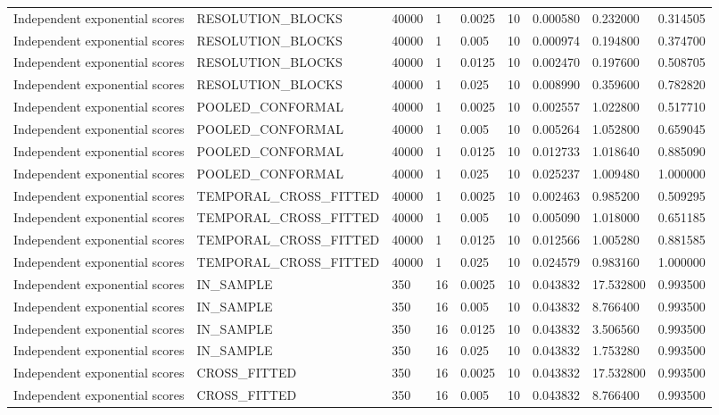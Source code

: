\begin{tabular}{lllllllll}
Independent exponential scores & RESOLUTION\_BLOCKS & 40000 & 1 & 0.0025 & 10 & 0.000580 & 0.232000 & 0.314505 \\
Independent exponential scores & RESOLUTION\_BLOCKS & 40000 & 1 & 0.005 & 10 & 0.000974 & 0.194800 & 0.374700 \\
Independent exponential scores & RESOLUTION\_BLOCKS & 40000 & 1 & 0.0125 & 10 & 0.002470 & 0.197600 & 0.508705 \\
Independent exponential scores & RESOLUTION\_BLOCKS & 40000 & 1 & 0.025 & 10 & 0.008990 & 0.359600 & 0.782820 \\
Independent exponential scores & POOLED\_CONFORMAL & 40000 & 1 & 0.0025 & 10 & 0.002557 & 1.022800 & 0.517710 \\
Independent exponential scores & POOLED\_CONFORMAL & 40000 & 1 & 0.005 & 10 & 0.005264 & 1.052800 & 0.659045 \\
Independent exponential scores & POOLED\_CONFORMAL & 40000 & 1 & 0.0125 & 10 & 0.012733 & 1.018640 & 0.885090 \\
Independent exponential scores & POOLED\_CONFORMAL & 40000 & 1 & 0.025 & 10 & 0.025237 & 1.009480 & 1.000000 \\
Independent exponential scores & TEMPORAL\_CROSS\_FITTED & 40000 & 1 & 0.0025 & 10 & 0.002463 & 0.985200 & 0.509295 \\
Independent exponential scores & TEMPORAL\_CROSS\_FITTED & 40000 & 1 & 0.005 & 10 & 0.005090 & 1.018000 & 0.651185 \\
Independent exponential scores & TEMPORAL\_CROSS\_FITTED & 40000 & 1 & 0.0125 & 10 & 0.012566 & 1.005280 & 0.881585 \\
Independent exponential scores & TEMPORAL\_CROSS\_FITTED & 40000 & 1 & 0.025 & 10 & 0.024579 & 0.983160 & 1.000000 \\
Independent exponential scores & IN\_SAMPLE & 350 & 16 & 0.0025 & 10 & 0.043832 & 17.532800 & 0.993500 \\
Independent exponential scores & IN\_SAMPLE & 350 & 16 & 0.005 & 10 & 0.043832 & 8.766400 & 0.993500 \\
Independent exponential scores & IN\_SAMPLE & 350 & 16 & 0.0125 & 10 & 0.043832 & 3.506560 & 0.993500 \\
Independent exponential scores & IN\_SAMPLE & 350 & 16 & 0.025 & 10 & 0.043832 & 1.753280 & 0.993500 \\
Independent exponential scores & CROSS\_FITTED & 350 & 16 & 0.0025 & 10 & 0.043832 & 17.532800 & 0.993500 \\
Independent exponential scores & CROSS\_FITTED & 350 & 16 & 0.005 & 10 & 0.043832 & 8.766400 & 0.993500 \\

\end{tabular}
